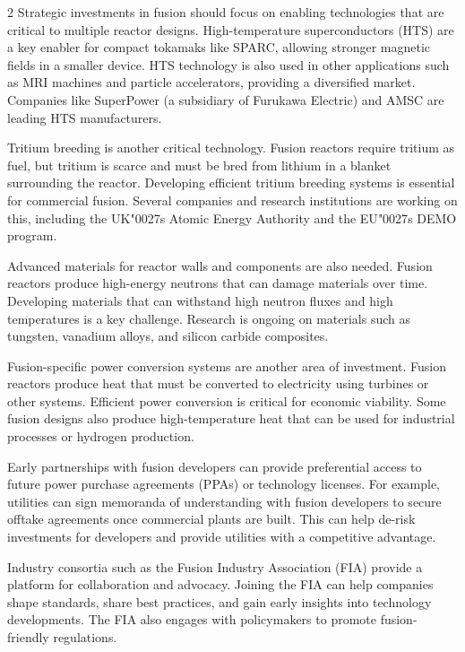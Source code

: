 \documentclass[10pt,a4paper]{article}
\newcommand{\BOApos}{{\BOQuoteFont\char"0027}}
\begin{document}
\begin{multicols}{2}
{\small Strategic investments in fusion should focus on enabling technologies that are critical to multiple reactor designs. High-temperature superconductors (HTS) are a key enabler for compact tokamaks like SPARC, allowing stronger magnetic fields in a smaller device. HTS technology is also used in other applications such as MRI machines and particle accelerators, providing a diversified market. Companies like SuperPower (a subsidiary of Furukawa Electric) and AMSC are leading HTS manufacturers.}\par
{\small Tritium breeding is another critical technology. Fusion reactors require tritium as fuel, but tritium is scarce and must be bred from lithium in a blanket surrounding the reactor. Developing efficient tritium breeding systems is essential for commercial fusion. Several companies and research institutions are working on this, including the UK\BOApos{}s Atomic Energy Authority and the EU\BOApos{}s DEMO program.}\par
{\small Advanced materials for reactor walls and components are also needed. Fusion reactors produce high-energy neutrons that can damage materials over time. Developing materials that can withstand high neutron fluxes and high temperatures is a key challenge. Research is ongoing on materials such as tungsten, vanadium alloys, and silicon carbide composites.}\par
{\small Fusion-specific power conversion systems are another area of investment. Fusion reactors produce heat that must be converted to electricity using turbines or other systems. Efficient power conversion is critical for economic viability. Some fusion designs also produce high-temperature heat that can be used for industrial processes or hydrogen production.}\par
{\small Early partnerships with fusion developers can provide preferential access to future power purchase agreements (PPAs) or technology licenses. For example, utilities can sign memoranda of understanding with fusion developers to secure offtake agreements once commercial plants are built. This can help de-risk investments for developers and provide utilities with a competitive advantage.}\par
{\small Industry consortia such as the Fusion Industry Association (FIA) provide a platform for collaboration and advocacy. Joining the FIA can help companies shape standards, share best practices, and gain early insights into technology developments. The FIA also engages with policymakers to promote fusion-friendly regulations.}\par
\end{multicols}
\label{chap:5:end}
\end{document}
